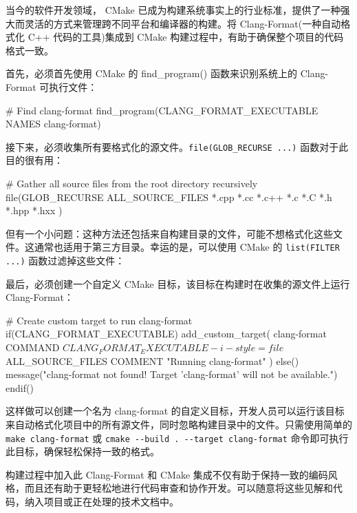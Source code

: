 当今的软件开发领域， CMake 已成为构建系统事实上的行业标准，提供了一种强大而灵活的方式来管理跨不同平台和编译器的构建。将 Clang-Format(一种自动格式化 C++ 代码的工具)集成到 CMake 构建过程中，有助于确保整个项目的代码格式一致。

首先，必须首先使用 CMake 的 find\_program() 函数来识别系统上的 Clang-Format 可执行文件：

\begin{cmake}
# Find clang-format
find_program(CLANG_FORMAT_EXECUTABLE NAMES clang-format)
\end{cmake}

接下来，必须收集所有要格式化的源文件。\verb|file(GLOB_RECURSE ...)| 函数对于此目的很有用：

\begin{cmake}
# Gather all source files from the root directory recursively
file(GLOB_RECURSE ALL_SOURCE_FILES
    *.cpp
    *.cc
    *.c++
    *.c
    *.C
    *.h
    *.hpp
    *.hxx
)
\end{cmake}

但有一个小问题：这种方法还包括来自构建目录的文件，可能不想格式化这些文件。这通常也适用于第三方目录。幸运的是，可以使用 CMake 的 \verb|list(FILTER ...)| 函数过滤掉这些文件：


最后，必须创建一个自定义 CMake 目标，该目标在构建时在收集的源文件上运行 Clang-Format：

\begin{cmake}
# Create custom target to run clang-format
if(CLANG_FORMAT_EXECUTABLE)
    add_custom_target(
        clang-format
        COMMAND ${CLANG_FORMAT_EXECUTABLE} -i -style=file ${ALL_SOURCE_FILES}
        COMMENT "Running clang-format"
    )
else()
    message("clang-format not found! Target 'clang-format' will not be available.")
endif()
\end{cmake}

这样做可以创建一个名为 clang-format 的自定义目标，开发人员可以运行该目标来自动格式化项目中的所有源文件，同时忽略构建目录中的文件。只需使用简单的 \verb|make clang-format| 或 \verb|cmake --build . --target clang-format| 命令即可执行此目标，确保轻松保持一致的格式。

构建过程中加入此 Clang-Format 和 CMake 集成不仅有助于保持一致的编码风格，而且还有助于更轻松地进行代码审查和协作开发。可以随意将这些见解和代码，纳入项目或正在处理的技术文档中。



